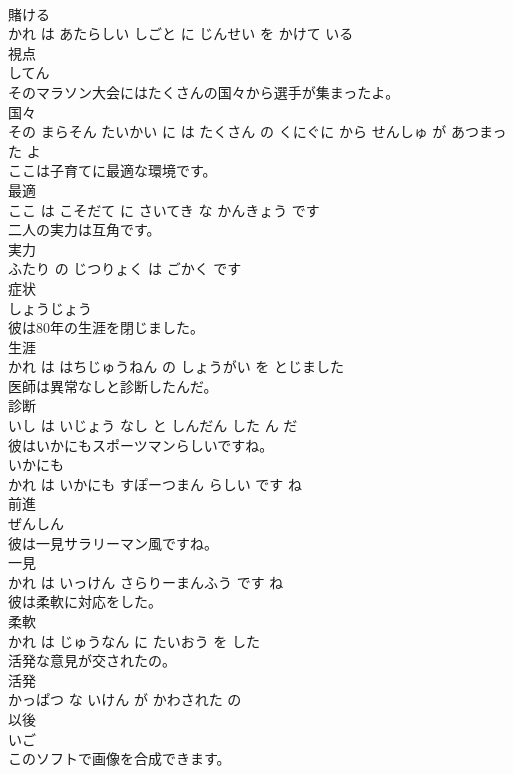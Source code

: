 \documentclass[8pt]{extreport}
\begin{document}
\begin{CJK}{UTF8}{min}
\\	賭ける 
\\	かれ は あたらしい しごと に じんせい を かけて いる			
\\	視点	
\\	してん			
\\	そのマラソン大会にはたくさんの国々から選手が集まったよ。	
\\	国々 
\\	その まらそん たいかい に は たくさん の くにぐに から せんしゅ が あつまった よ			
\\	ここは子育てに最適な環境です。	
\\	最適 
\\	ここ は こそだて に さいてき な かんきょう です			
\\	二人の実力は互角です。	
\\	実力 
\\	ふたり の じつりょく は ごかく です			
\\	症状	
\\	しょうじょう			
\\	彼は80年の生涯を閉じました。	
\\	生涯 
\\	かれ は はちじゅうねん の しょうがい を とじました			
\\	医師は異常なしと診断したんだ。	
\\	診断 
\\	いし は いじょう なし と しんだん した ん だ			
\\	彼はいかにもスポーツマンらしいですね。	
\\	いかにも 
\\	かれ は いかにも すぽーつまん らしい です ね			
\\	前進	
\\	ぜんしん			
\\	彼は一見サラリーマン風ですね。	
\\	一見 
\\	かれ は いっけん さらりーまんふう です ね			
\\	彼は柔軟に対応をした。	
\\	柔軟 
\\	かれ は じゅうなん に たいおう を した			
\\	活発な意見が交されたの。	
\\	活発 
\\	かっぱつ な いけん が かわされた の			
\\	以後	
\\	いご			
\\	このソフトで画像を合成できます。	

\end{CJK}
\end{document}
